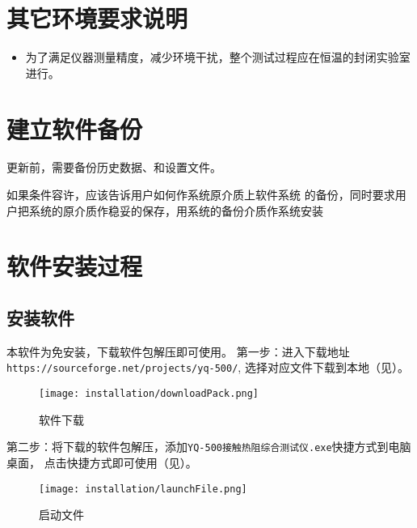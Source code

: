 \section{其它环境要求说明}
\begin{itemize}
    \item 为了满足仪器测量精度，减少环境干扰，整个测试过程应在恒温的封闭实验室进行。
\end{itemize}

\section{建立软件备份}
更新前，需要备份历史数据、和设置文件。

如果条件容许，应该告诉用户如何作系统原介质上软件系统
的备份，同时要求用户把系统的原介质作稳妥的保存，用系统的备份介质作系统安装
\section{软件安装过程}
\subsection{安装软件\label{subsec:install}}
本软件为免安装，下载软件包解压即可使用。
第一步：进入下载地址\lstinline{https://sourceforge.net/projects/yq-500/},
选择对应文件下载到本地（见）。
\begin{figure}[htbp]
    \centering
    \texttt{[image: installation/downloadPack.png]}
    \caption{ 软件下载 \label{fig:downloadPack}}
\end{figure}
第二步：将下载的软件包解压，添加\lstinline{YQ-500接触热阻综合测试仪.exe}快捷方式到电脑桌面，
点击快捷方式即可使用（见）。
\begin{figure}[htbp]
    \centering
    \texttt{[image: installation/launchFile.png]}
    \caption{ 启动文件 \label{fig:launchFile}}
\end{figure}
